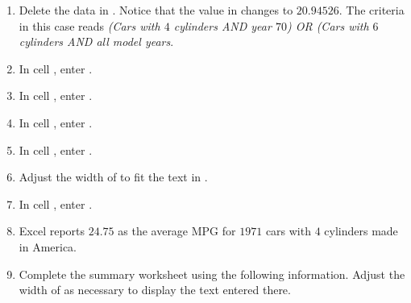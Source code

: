\begin{enumerate}[resume]

	\item Delete the data in . Notice that the value in  changes to $ 20.94526 $. The criteria in this case reads \textit{(Cars with $ 4 $ cylinders AND year $ 70 $) OR (Cars with $ 6 $ cylinders AND all model years}. 
	\item In cell , enter .
	\item In cell , enter .
	\item In cell , enter .
	\item In cell , enter .
	\item Adjust the width of  to fit the text in .
	\item In cell , enter .
	\item Excel reports $ 24.75 $ as the average MPG for $ 1971 $ cars with $ 4 $ cylinders made in America. 
	
	\item Complete the summary worksheet using the following information. Adjust the width of  as necessary to display the text entered there.
	
\end{enumerate}	

